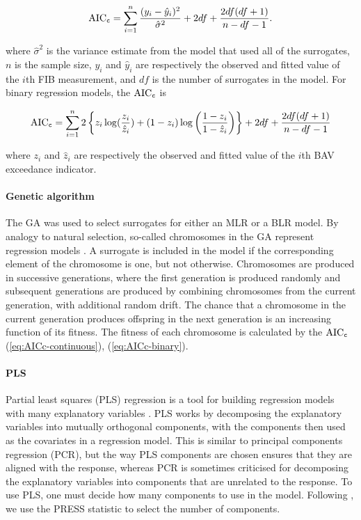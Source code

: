 \documentclass[authoryear,review, 12pt]{elsarticle}
\begin{document}
\begin{align}\label{eq:AICc-continuous}
\text{AIC}_{\tt c} = \sum_{i=1}^n \frac{(y_i - \hat{y}_i)^2}{\hat{\sigma}^2} + 2df + \frac{2df(df+1)}{n-df-1}.
\end{align}

where \(\hat{\sigma}^2\) is the variance estimate from the model that
used all of the surrogates, \(n\) is the sample size, \(y_i\) and
\(\hat{y}_i\) are respectively the observed and fitted value of the
\(i\)th FIB measurement, and \(df\) is the number of surrogates in the
model. For binary regression models, the \(\text{AIC}_{\tt c}\) is

\begin{align}\label{eq:AICc-binary}
\text{AIC}_{\tt c} = \sum_{i=1}^n  2\left\{ z_i \log (\frac{z_i}{\hat{z}_i}) + (1-z_i) \log \left( \frac{1-z_i}{1-\hat{z}_i} \right) \right\} + 2df + \frac{2df(df+1)}{n-df-1}
\end{align}

where \(z_i\) and \(\hat{z}_i\) are respectively the observed and fitted
value of the \(i\)th BAV exceedance indicator.

\paragraph{Genetic algorithm}\label{genetic-algorithm}

The GA was used to select surrogates for either an MLR or a BLR
 model. By analogy to natural selection, so-called chromosomes
in the GA represent regression models \citep{Fogel-1998}. A surrogate is
included in the model if the corresponding element of the chromosome is
one, but not otherwise. Chromosomes are produced in successive
generations, where the first generation is produced randomly and
subsequent generations are produced by combining chromosomes from the
current generation, with additional random drift. The chance that a
chromosome in the current generation produces offspring in the next
generation is an increasing function of its fitness. The fitness of each
chromosome is calculated by the \(\text{AIC}_{\tt c}\)
(\ref{eq:AICc-continuous}), (\ref{eq:AICc-binary}).

\paragraph{PLS}\label{pls}

Partial least squares (PLS) regression is a tool for building regression
models with many explanatory variables \citep{Wold-Sjostrum-Eriksson-2001}. PLS
works by decomposing the explanatory variables into mutually orthogonal components,
with the components then used as the covariates in a regression model.
This is similar to principal components regression (PCR), but the way
PLS components are chosen ensures that they are aligned with the
response, whereas PCR is sometimes criticised for decomposing the
explanatory variables into components that are unrelated to the response. To use
PLS, one must decide how many components to use in the model. Following
\citep{Brooks-Fienen-Corsi-2013}, we use the PRESS statistic to select
the number of components.
\end{document}
